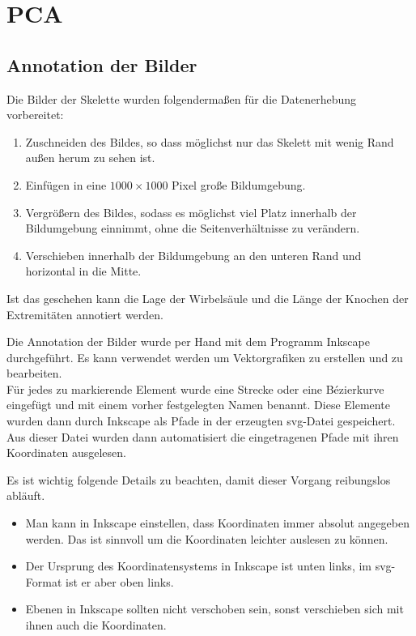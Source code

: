 \newpage
\section{PCA}
\label{implementation_detail_pca}

\subsection{Annotation der Bilder}

Die Bilder der Skelette wurden folgendermaßen für die Datenerhebung vorbereitet:
 
 \begin{enumerate}
  \item Zuschneiden des Bildes, so dass möglichst nur das Skelett mit wenig Rand außen herum zu sehen ist.
  \item Einfügen in eine $1000 \times 1000$ Pixel große Bildumgebung.
  \item Vergrößern des Bildes, sodass es möglichst viel Platz innerhalb der Bildumgebung einnimmt, ohne die Seitenverhältnisse zu verändern.
  \item Verschieben innerhalb der Bildumgebung an den unteren Rand und horizontal in die Mitte.
 \end{enumerate}

 Ist das geschehen kann die Lage der Wirbelsäule und die Länge der Knochen der Extremitäten annotiert werden.

Die Annotation der Bilder wurde per Hand mit dem Programm Inkscape \cite{inkscape} durchgeführt. Es kann verwendet werden um Vektorgrafiken zu erstellen und zu bearbeiten.\\
Für jedes zu markierende Element wurde eine Strecke oder eine Bézierkurve eingefügt und mit einem vorher festgelegten Namen benannt. Diese Elemente wurden dann durch Inkscape als Pfade in der erzeugten svg-Datei gespeichert. Aus dieser Datei wurden dann automatisiert die eingetragenen Pfade mit ihren Koordinaten ausgelesen.

Es ist wichtig folgende Details zu beachten, damit dieser Vorgang reibungslos abläuft. 
\begin{itemize}
 \item Man kann in Inkscape einstellen, dass Koordinaten immer absolut angegeben werden. Das ist sinnvoll um die Koordinaten leichter auslesen zu können.
 \item Der Ursprung des Koordinatensystems in Inkscape ist unten links, im svg-Format ist er aber oben links.
 \item Ebenen in Inkscape sollten nicht verschoben sein, sonst verschieben sich mit ihnen auch die Koordinaten.  
\end{itemize}

